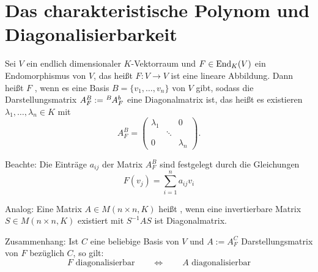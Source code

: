\section{Das charakteristische Polynom und Diagonalisierbarkeit}
\label{sec:2.2}

Sei $V$ ein endlich dimensionaler $K$-Vektorraum und $F \in \operatorname{End}_K(V)$ ein Endomorphismus von $V$, das heißt $F\colon V \rightarrow V$ ist eine lineare Abbildung.
Dann heißt $F$ , wenn es eine Basis $B=\{v_1,\dots,v_n\}$ von $V$ gibt, sodass die Darstellungsmatrix $A_F^B := \mat{A}{B}{b}{F}$ eine Diagonalmatrix ist, das heißt es existieren $\lambda_1,\dots,\lambda_n \in K$ mit
\[
	A^B_F = \begin{pmatrix}
	\lambda_1 &  & 0 \\ 
	& \ddots &  \\ 
	0 &  & \lambda_n
	\end{pmatrix}.
\]

Beachte: Die Einträge $a_{ij}$ der Matrix $A_F^B$ sind festgelegt durch die Gleichungen
\begin{equation}
	F(v_j) = \sum_{i=1}^{n} a_{ij} v_i	\label{eq:darstellungsmatrix}
\end{equation}

Analog: Eine Matrix $A \in M(n\times n,K)$ heißt , wenn eine invertierbare Matrix $S \in M(n \times n,K)$ existiert mit $S^{-1}AS$ ist Diagonalmatrix.

Zusammenhang: Ist $C$ eine beliebige Basis von $V$ und $A := A_F^C$ Darstellungsmatrix von $F$ bezüglich $C$, so gilt:
\[
	F \text{ diagonalisierbar} \qquad \Leftrightarrow \qquad A \text{ diagonalisierbar}
\]

